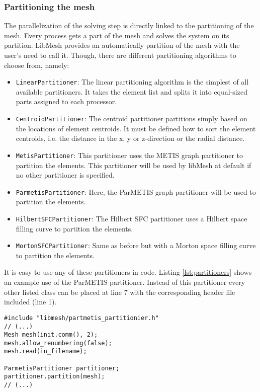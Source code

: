   \subsubsection{Partitioning the mesh}
   The parallelization of the solving step is directly linked to the partitioning of the mesh. Every process gets a part of the mesh and solves the system on its partition. LibMesh provides an automatically partition of the mesh with the user's need to call it. Though, there are different partitioning algorithms to choose from, namely:
   \begin{itemize}
   	\item \texttt{LinearPartitioner}: The linear partitioning algorithm is the simplest of all available partitioners. It takes the element list and splits it into equal-sized parts assigned to each processor.
   	\item \texttt{CentroidPartitioner}: The centroid partitioner partitions simply based on the locations of element centroids. It must be defined how to sort the element centroids, i.e. the distance in the x, y or z-direction or the radial distance.
   	\item \texttt{MetisPartitioner}: This partitioner uses the METIS graph partitioner to partition the elements. This partitioner will be used by libMesh at default if no other partitioner is specified.
   	\item \texttt{ParmetisPartitioner}: Here, the ParMETIS graph partitioner will be used to partition the elements.
   	\item \texttt{HilbertSFCPartitioner}: The Hilbert SFC partitioner uses a Hilbert space filling curve to partition the elements.
   	\item \texttt{MortonSFCPartitioner}: Same as before but with a Morton space filling curve to partition the elements.
   \end{itemize}
   It is easy to use any of these partitioners in code. Listing \ref{lst:partitioners} shows an example use of the ParMETIS partitioner. Instead of this partitioner every other listed class can be placed at line 7 with the corresponding header file included (line 1).
\begin{lstlisting}[caption=Mesh partitioning example,label=lst:partitioners,keepspaces=true]
#include "libmesh/partmetis_partitionier.h"
// (...)
Mesh mesh(init.comm(), 2);
mesh.allow_renumbering(false);
mesh.read(in_filename);	

ParmetisPartitioner partitioner;
partitioner.partition(mesh);
// (...)
\end{lstlisting}
  

